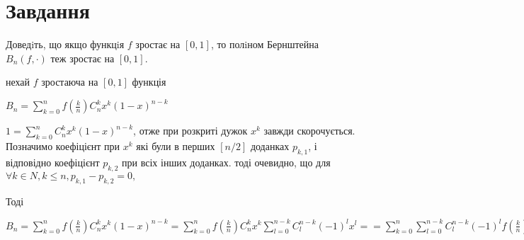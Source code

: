 
\chapter{Завдання \theHchapter}

\begin{tcolorbox}[title=Завдання]
    Доведiть, що якщо функцiя $f$ зростає на $[0, 1]$, то полiном 
    Бернштейна $B_n(f, \cdot)$ теж зростає на $[0, 1]$.
\end{tcolorbox}


нехай $f$ зростаюча на $[0, 1]$ функція 


$ B_n = \sum\limits_{k=0}^{n}f(\frac{k}{n})C_n^kx^k(1 - x)^{n - k} $



$1 = \sum\limits_{k=0}^{n}C_n^kx^k(1 - x)^{n - k} $, отже при розкриті дужок
$x^k$ завжди скорочується. 
Позначимо коефіцієнт при $x^k$
які були в перших $[n/2]$ доданках $p_{k, 1}$,
і відповідно коефіцієнт $p_{k, 2}$ при всіх інших доданках.
тоді очевидно, що для 
$\forall k \in N, k \le n, p_{k, 1} - p_{k, 2} = 0, $


Тоді 

$ B_n = \sum\limits_{k=0}^{n}f(\frac{k}{n})C_n^kx^k(1 - x)^{n - k} = 
\sum\limits_{k=0}^{n}f(\frac{k}{n})C_n^kx^k
\sum\limits_{l=0}^{n - k}C_l^{n-k}(-1)^l x^l = 
=\sum\limits_{k=0}^{n}\sum\limits_{l=0}^{n - k}
C_l^{n-k}(-1)^l f(\frac{k}{n})C_n^k x^{k+l}
=\sum\limits_{k=0}^{n}\sum\limits_{l=0}^{n - k}
\frac{(n-k)! n!}{l! (n - k -l)! (n - k)! k!}(-1)^l f(\frac{k}{n})x^{k+l} $